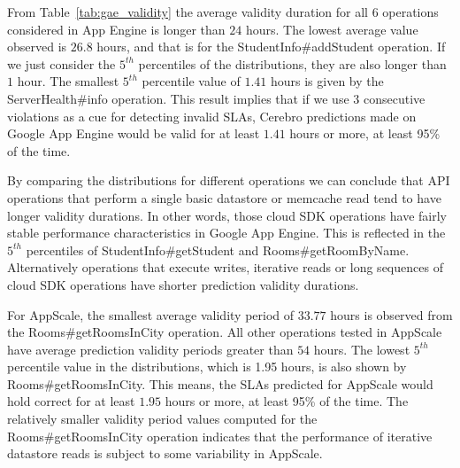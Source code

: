
From Table~\ref{tab:gae_validity} 
the average validity duration for all 6 operations considered in App Engine is
longer than $24$ hours. The lowest average value observed is $26.8$ hours, 
and that is for the StudentInfo\#addStudent operation. If we
just consider the $5^{th}$ percentiles of the distributions, they are 
also longer than $1$ hour. The smallest $5^{th}$ percentile value of 
$1.41$ hours is 
given by the ServerHealth\#info operation. This result implies that if we use 
$3$ consecutive violations as a cue for detecting invalid SLAs,
Cerebro predictions made on Google App Engine would be valid for at least
$1.41$ hours or more, at least 95\% of the time.

By comparing the distributions for different operations we can conclude that
API operations that perform a single basic datastore or memcache read tend to
have longer validity durations. In other words, those cloud SDK operations have
fairly stable performance characteristics in Google App Engine. 
This is reflected in
the $5^{th}$ percentiles of StudentInfo\#getStudent and Rooms\#getRoomByName. 
Alternatively
operations that execute writes, iterative reads or long sequences of cloud SDK
operations have shorter prediction validity durations.

For AppScale, 
the smallest average validity period of $33.77$ hours is observed from the
Rooms\#getRoomsInCity operation. All other operations tested in 
AppScale have average prediction validity periods greater
than $54$ hours. The lowest $5^{th}$ percentile value in the 
distributions, which is 1.95 hours, is 
also shown by Rooms\#getRoomsInCity. This means, the SLAs predicted for
AppScale would hold correct for at least $1.95$ hours or more, 
at least 95\% of the time.
The relatively smaller validity period values computed for the
Rooms\#getRoomsInCity operation indicates that the performance of 
iterative datastore reads is subject to some variability 
in AppScale.

